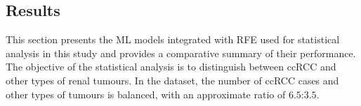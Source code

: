 \documentclass[final,british,a4paper,12pt]{phdthesis}
\begin{document}




\subsection{Results}
\label{sec:analysis}

This section presents the ML models integrated with RFE used for statistical analysis in this study and provides a comparative summary of their performance. The objective of the statistical analysis is to distinguish between ccRCC and other types of renal tumours. In the dataset, the number of ccRCC cases and other types of tumours is balanced, with an approximate ratio of $6.5$:$3.5$.
\end{document}

